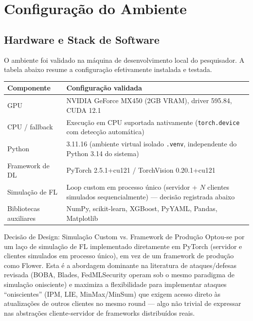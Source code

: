 \documentclass[11pt,a4paper]{article}
\begin{document}
\section{Configuração do Ambiente}

\subsection{Hardware e Stack de Software}
O ambiente foi validado na máquina de desenvolvimento local do pesquisador. A tabela abaixo resume a
configuração efetivamente instalada e testada.

\begin{table}[htbp]
\centering
\small
\begin{tabular}{p{4.2cm}p{10cm}}
\toprule
\textbf{Componente} & \textbf{Configuração validada} \\
\midrule
\rowcolor{lightbg} GPU & NVIDIA GeForce MX450 (2GB VRAM), driver 595.84, CUDA 12.1 \\
CPU / fallback & Execução em CPU suportada nativamente (\texttt{torch.device} com detecção automática) \\
\rowcolor{lightbg} Python & 3.11.16 (ambiente virtual isolado \texttt{.venv}, independente do Python 3.14 do sistema) \\
Framework de DL & PyTorch 2.5.1+cu121 / TorchVision 0.20.1+cu121 \\
\rowcolor{lightbg} Simulação de FL & Loop custom em processo único (servidor + $N$ clientes simulados sequencialmente) — decisão registrada abaixo \\
Bibliotecas auxiliares & NumPy, scikit-learn, XGBoost, PyYAML, Pandas, Matplotlib \\
\bottomrule
\end{tabular}
\end{table}

\begin{calloutbox}{Decisão de Design: Simulação Custom vs. Framework de Produção}
Optou-se por um laço de simulação de FL implementado diretamente em PyTorch (servidor e clientes
simulados em processo único), em vez de um framework de produção como Flower. Esta é a abordagem
dominante na literatura de ataques/defesas revisada (BOBA, Blades, FedMLSecurity operam sob o mesmo
paradigma de simulação onisciente) e maximiza a flexibilidade para implementar ataques ``oniscientes''
(IPM, LIE, MinMax/MinSum) que exigem acesso direto às atualizações de outros clientes no mesmo round —
algo não trivial de expressar nas abstrações cliente-servidor de frameworks distribuídos reais.
\end{calloutbox}
\end{document}
